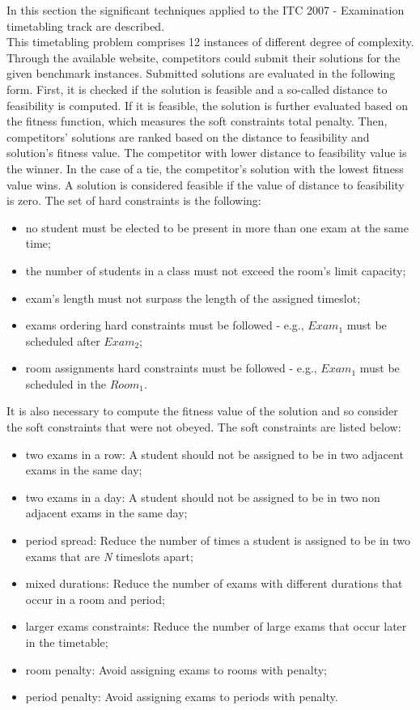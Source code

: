 In this section the significant techniques applied to the ITC 2007 - Examination timetabling track are described. \\
This timetabling problem comprises 12 instances of different degree of complexity. Through the available website, competitors could submit their solutions for the given benchmark instances. Submitted solutions are evaluated in the following form. First, it is checked if the solution is feasible and a so-called distance to feasibility is computed. If it is feasible, the solution is further evaluated based on the fitness function, which measures the soft constraints total penalty. Then, competitors' solutions are ranked based on the distance to feasibility and solution's fitness value. The competitor with lower distance to feasibility value is the winner. In the case of a tie, the competitor's solution with the lowest fitness value wins. A solution is considered feasible if the value of distance to feasibility is zero. The set of hard constraints is the following:
\begin{itemize}
	\item no student must be elected to be present in more than one exam at the same time;
	\item the number of students in a class must not exceed the room's limit capacity;
	\item exam's length must not surpass the length of the assigned timeslot;
	\item exams ordering hard constraints must be followed - e.g., $Exam_1$ must be scheduled after $Exam_2$;
	\item room assignments hard constraints must be followed - e.g., 	$Exam_1$ must be scheduled in the $Room_1$.
\end{itemize}

It is also necessary to compute the fitness value of the solution and so consider the soft constraints that were not obeyed. The soft constraints are listed below:
\begin{itemize}
	\item two exams in a row: A student should not be assigned to be in two adjacent exams in the same day;
	\item two exams in a day: A student should not be assigned to be in two non adjacent exams in the same day;
	\item period spread: Reduce the number of times a student is assigned to be in two exams that are \textit{N} timeslots apart;
	\item mixed durations: Reduce the number of exams with different durations that occur in a room and period;
	\item larger exams constraints: Reduce the number of large exams that occur later in the timetable;
	\item room penalty: Avoid assigning exams to rooms with penalty;
	\item period penalty: Avoid assigning exams to periods with penalty.
\end{itemize}

